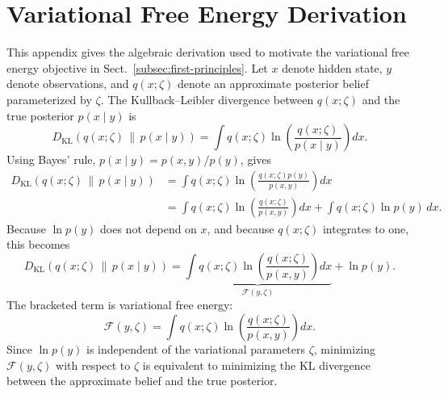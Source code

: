\appendix
\section{Variational Free Energy Derivation}
\label{app:vfe-derivation}

This appendix gives the algebraic derivation used to motivate the variational free energy objective in Sect.~\ref{subsec:first-principles}. Let $x$ denote hidden state, $y$ denote observations, and $q(x;\zeta)$ denote an approximate posterior belief parameterized by $\zeta$. The Kullback--Leibler divergence between $q(x;\zeta)$ and the true posterior $p(x\mid y)$ is
\begin{equation}
    D_{\mathrm{KL}}
    \left(
        q(x;\zeta) \,\|\, p(x\mid y)
    \right)
    =
    \int q(x;\zeta)
    \ln
    \left(
        \frac{q(x;\zeta)}{p(x\mid y)}
    \right) dx .
    \label{eq:appendix-kl-posterior}
\end{equation}
Using Bayes' rule, $p(x\mid y)=p(x,y)/p(y)$, gives
\begin{align}
    D_{\mathrm{KL}}
    \left(
        q(x;\zeta) \,\|\, p(x\mid y)
    \right)
    &=
    \int q(x;\zeta)
    \ln
    \left(
        \frac{q(x;\zeta)p(y)}{p(x,y)}
    \right) dx
    \nonumber \\
    &=
    \int q(x;\zeta)
    \ln
    \left(
        \frac{q(x;\zeta)}{p(x,y)}
    \right) dx
    +
    \int q(x;\zeta)\ln p(y)\,dx .
    \label{eq:appendix-kl-expanded}
\end{align}
Because $\ln p(y)$ does not depend on $x$, and because $q(x;\zeta)$ integrates to one, this becomes
\begin{equation}
    D_{\mathrm{KL}}
    \left(
        q(x;\zeta) \,\|\, p(x\mid y)
    \right)
    =
    \underbrace{
    \int q(x;\zeta)
    \ln
    \left(
        \frac{q(x;\zeta)}{p(x,y)}
    \right) dx
    }_{\mathcal{F}(y,\zeta)}
    +
    \ln p(y).
    \label{eq:appendix-vfe-definition}
\end{equation}
The bracketed term is variational free energy:
\begin{equation}
    \mathcal{F}(y,\zeta)
    =
    \int q(x;\zeta)
    \ln
    \left(
        \frac{q(x;\zeta)}{p(x,y)}
    \right) dx .
    \label{eq:appendix-vfe}
\end{equation}
Since $\ln p(y)$ is independent of the variational parameters $\zeta$, minimizing $\mathcal{F}(y,\zeta)$ with respect to $\zeta$ is equivalent to minimizing the KL divergence between the approximate belief and the true posterior.

